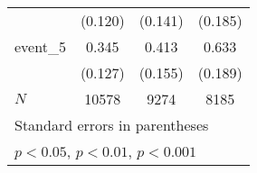 {\begin{tabular}{l*{3}{c}}
            &     (0.120)         &     (0.141)         &     (0.185)         \\
[1em]
event\_5     &       0.345\sym{**} &       0.413\sym{**} &       0.633\sym{***}\\
            &     (0.127)         &     (0.155)         &     (0.189)         \\
\hline
\(N\)       &       10578         &        9274         &        8185         \\
\hline\hline
\multicolumn{4}{l}{\footnotesize Standard errors in parentheses}\\
\multicolumn{4}{l}{\footnotesize \sym{*} \(p<0.05\), \sym{**} \(p<0.01\), \sym{***} \(p<0.001\)}\\
\end{tabular}
}
